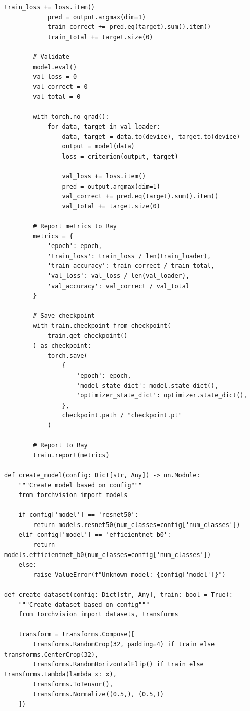 \begin{lstlisting}[style=python, caption=Distributed Training with Ray Train]
            train_loss += loss.item()
            pred = output.argmax(dim=1)
            train_correct += pred.eq(target).sum().item()
            train_total += target.size(0)

        # Validate
        model.eval()
        val_loss = 0
        val_correct = 0
        val_total = 0

        with torch.no_grad():
            for data, target in val_loader:
                data, target = data.to(device), target.to(device)
                output = model(data)
                loss = criterion(output, target)

                val_loss += loss.item()
                pred = output.argmax(dim=1)
                val_correct += pred.eq(target).sum().item()
                val_total += target.size(0)

        # Report metrics to Ray
        metrics = {
            'epoch': epoch,
            'train_loss': train_loss / len(train_loader),
            'train_accuracy': train_correct / train_total,
            'val_loss': val_loss / len(val_loader),
            'val_accuracy': val_correct / val_total
        }

        # Save checkpoint
        with train.checkpoint_from_checkpoint(
            train.get_checkpoint()
        ) as checkpoint:
            torch.save(
                {
                    'epoch': epoch,
                    'model_state_dict': model.state_dict(),
                    'optimizer_state_dict': optimizer.state_dict(),
                },
                checkpoint.path / "checkpoint.pt"
            )

        # Report to Ray
        train.report(metrics)

def create_model(config: Dict[str, Any]) -> nn.Module:
    """Create model based on config"""
    from torchvision import models

    if config['model'] == 'resnet50':
        return models.resnet50(num_classes=config['num_classes'])
    elif config['model'] == 'efficientnet_b0':
        return models.efficientnet_b0(num_classes=config['num_classes'])
    else:
        raise ValueError(f"Unknown model: {config['model']}")

def create_dataset(config: Dict[str, Any], train: bool = True):
    """Create dataset based on config"""
    from torchvision import datasets, transforms

    transform = transforms.Compose([
        transforms.RandomCrop(32, padding=4) if train else transforms.CenterCrop(32),
        transforms.RandomHorizontalFlip() if train else transforms.Lambda(lambda x: x),
        transforms.ToTensor(),
        transforms.Normalize((0.5,), (0.5,))
    ])


\end{lstlisting}
